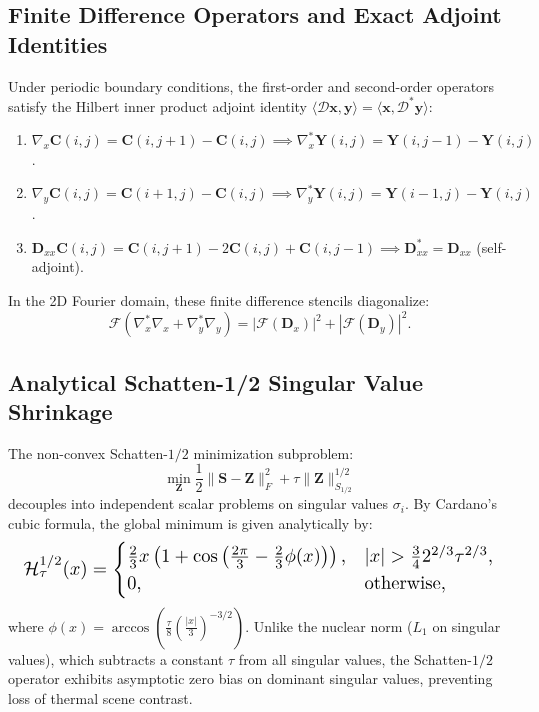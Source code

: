\documentclass[10pt,conference]{IEEEtran}
\begin{document}
\subsection{Finite Difference Operators and Exact Adjoint Identities}
Under periodic boundary conditions, the first-order and second-order operators satisfy the Hilbert inner product adjoint identity $\langle \mathcal{D} \mathbf{x}, \mathbf{y} \rangle = \langle \mathbf{x}, \mathcal{D}^* \mathbf{y} \rangle$:
\begin{enumerate}
    \item $\nabla_x \mathbf{C}(i, j) = \mathbf{C}(i, j+1) - \mathbf{C}(i, j) \implies \nabla_x^* \mathbf{Y}(i, j) = \mathbf{Y}(i, j-1) - \mathbf{Y}(i, j)$.
    \item $\nabla_y \mathbf{C}(i, j) = \mathbf{C}(i+1, j) - \mathbf{C}(i, j) \implies \nabla_y^* \mathbf{Y}(i, j) = \mathbf{Y}(i-1, j) - \mathbf{Y}(i, j)$.
    \item $\mathbf{D}_{xx} \mathbf{C}(i, j) = \mathbf{C}(i, j+1) - 2\mathbf{C}(i, j) + \mathbf{C}(i, j-1) \implies \mathbf{D}_{xx}^* = \mathbf{D}_{xx}$ (self-adjoint).
\end{enumerate}
In the 2D Fourier domain, these finite difference stencils diagonalize:
\begin{equation}
    \mathcal{F}(\nabla_x^* \nabla_x + \nabla_y^* \nabla_y) = |\mathcal{F}(\mathbf{D}_x)|^2 + |\mathcal{F}(\mathbf{D}_y)|^2.
\end{equation}

\subsection{Analytical Schatten-1/2 Singular Value Shrinkage}
The non-convex Schatten-$1/2$ minimization subproblem:
\begin{equation}
    \min_{\mathbf{Z}} \frac{1}{2} \|\mathbf{S} - \mathbf{Z}\|_F^2 + \tau \|\mathbf{Z}\|_{S_{1/2}}^{1/2}
    \label{eq:stage1_obj}
\end{equation}
decouples into independent scalar problems on singular values $\sigma_i$. By Cardano's cubic formula, the global minimum is given analytically by:
\begin{equation}
\resizebox{0.98\columnwidth}{!}{$
    \mathcal{H}_\tau^{1/2}(x) = \begin{cases}
        \frac{2}{3} x \left( 1 + \cos\left( \frac{2\pi}{3} - \frac{2}{3} \phi(x) \right) \right), & |x| > \frac{3}{4} 2^{2/3} \tau^{2/3}, \\
        0, & \text{otherwise},
    \end{cases}
$}
\end{equation}
where $\phi(x) = \arccos\left( \frac{\tau}{8} \left( \frac{|x|}{3} \right)^{-3/2} \right)$. Unlike the nuclear norm ($L_1$ on singular values), which subtracts a constant $\tau$ from all singular values, the Schatten-$1/2$ operator exhibits asymptotic zero bias on dominant singular values, preventing loss of thermal scene contrast.
\end{document}
